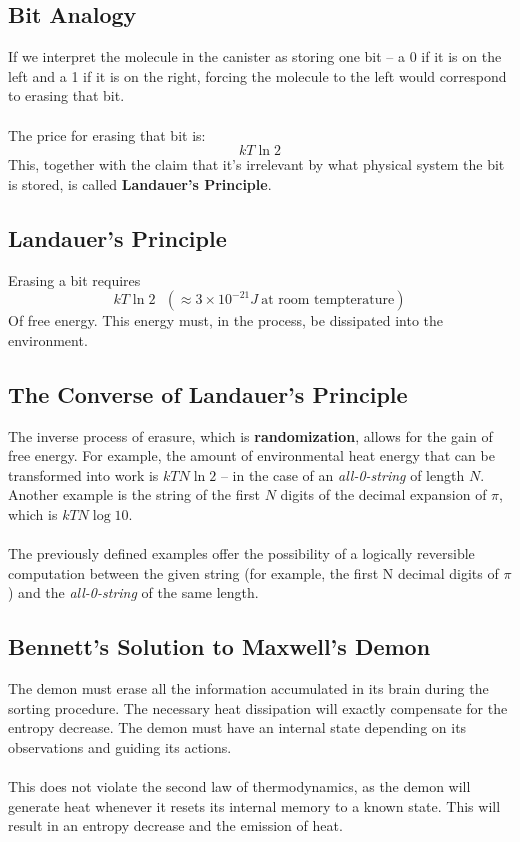 \documentclass{article}
\begin{document}
\subsection{Bit Analogy}
If we interpret the molecule in the canister as storing one bit -- a 0 if it is on the left and a 1 if it is on the right, forcing the molecule to the left would correspond to erasing that bit. \\ \\
The price for erasing that bit is:
\[ kT \ln 2 \]
This, together with the claim that it's irrelevant by what physical system the bit is stored, is called \textbf{Landauer's Principle}.

\subsection{Landauer's Principle}
Erasing a bit requires
\[ kT \ln 2 ~~~ (\approx 3 \times 10^{-21} J~ \text{at room tempterature}) \]
Of free energy. This energy must, in the process, be dissipated into the environment.

\subsection{The Converse of Landauer's Principle}
The inverse process of erasure, which is \textbf{randomization}, allows for the gain of free energy. For example, the amount of environmental heat energy that can be transformed into work is $kTN\ln2$ -- in the case of an \textit{all-0-string} of length $N$. Another example is the string of the first $N$ digits of the decimal expansion of $\pi$, which is $kTN\log10$. \\ \\
The previously defined examples offer the possibility of a logically reversible computation between the given string (for example, the first N decimal digits of $\pi$) and the \textit{all-0-string} of the same length.

\subsection{Bennett's Solution to Maxwell's Demon}
The demon must erase all the information accumulated in its brain during the sorting procedure. The necessary heat dissipation will exactly compensate for the entropy decrease. The demon must have an internal state depending on its observations and guiding its actions. \\ \\
This does not violate the second law of thermodynamics, as the demon will generate heat whenever it resets its internal memory to a known state. This will result in an entropy decrease and the emission of heat.
\end{document}
